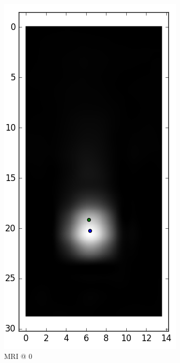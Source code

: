 \documentclass[parskip,bibtotoc,final,twoside=false,titlepage,a4paper,english,12pt,titlepage,a4paper]{scrbook}
\begin{document}
\begin{figure}[!tbp]
\begin{subfigure}[b]{0.32\textwidth}
    \includegraphics[scale=0.55]{python/centroid/MR_x100@0_centroids.png}
    \caption{MRI @ 0}
    \label{fig:MR_x100_centroids@0}
  \end{subfigure}
  \begin{subfigure}[b]{0.32\textwidth}

\end{subfigure}
\end{figure}
\end{document}
